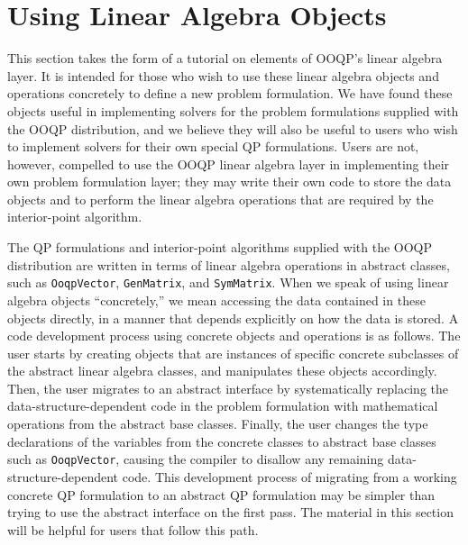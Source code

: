 \newcommand\mV{\texttt{mV}}
\newcommand\IotrAddRef{\texttt{IotrAddRef}}
\newcommand\IotrRelease{\texttt{IotrRelease}}
\newcommand\SimpleVector{\texttt{SimpleVector}}
\newcommand\SmartPointer{\texttt{SmartPointer}}
\newcommand\DenseGenMatrix{\texttt{DenseGenMatrix}}
\newcommand\DenseSymMatrix{\texttt{DenseSymMatrix}}
\newcommand\SparseGenMatrix{\texttt{SparseGenMatrix}}
\newcommand\SparseSymMatrix{\texttt{SparseSymMatrix}}

\section{Using Linear Algebra Objects}
\label{sec.using-linear-algebra}


This section takes the form of a tutorial on elements of OOQP's linear
algebra layer. It is intended for those who wish to use these linear
algebra objects and operations concretely to define a new problem
formulation.  We have found these objects useful in implementing
solvers for the problem formulations supplied with the OOQP
distribution, and we believe they will also be useful to users who wish
to implement solvers for their own special QP formulations. Users are
not, however, compelled to use the OOQP linear algebra layer in
implementing their own problem formulation layer; they may write their
own code to store the data objects and to perform the linear algebra
operations that are required by the interior-point algorithm.

The QP formulations and interior-point algorithms supplied with the
OOQP distribution are written in terms of linear algebra operations in
abstract classes, such as \texttt{OoqpVector}, \texttt{GenMatrix}, and
\texttt{SymMatrix}. When we speak of using linear algebra objects
``concretely,'' we mean accessing the data contained in these objects
directly, in a manner that depends explicitly on how the data is
stored. A code development process using concrete objects and
operations is as follows. The user starts by creating objects that are
instances of specific concrete subclasses of the abstract linear
algebra classes, and manipulates these objects accordingly. Then, the
user migrates to an abstract interface by systematically replacing the
data-structure-dependent code in the problem formulation with
mathematical operations from the abstract base classes. Finally, the
user changes the type declarations of the variables from the
concrete classes to abstract base classes such as
\texttt{OoqpVector}, causing the compiler to disallow any remaining
data-structure-dependent code. This development process of migrating
from a working concrete QP formulation to an abstract QP formulation
may be simpler than trying to use the abstract interface on the first
pass. The material in this section will be helpful for users that
follow this path.

